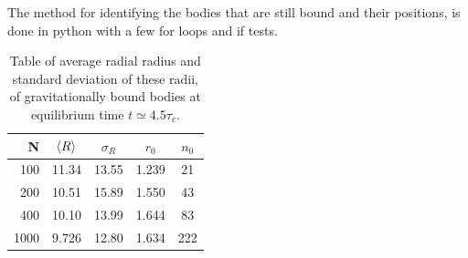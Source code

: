 \documentclass[11pt,a4paper,notitlepage,twocolumn]{article}
\begin{document}
The method for identifying the bodies that are still bound and their positions, is done in python with a few for loops and if tests.
\begin{table}
[H]\center
\begin{tabular}{|r|c|c|c|c|}\hline
	N & $\braket{R}$ & $\sigma_R$ & $r_0$ & $n_0$ \\ \hline
	100 & 11.34		& 13.55 & 1.239	& 21	\\ \hline
	200 & 10.51		& 15.89 & 1.550	& 43	\\ \hline
	400 & 10.10 	& 13.99 & 1.644	& 83	\\ \hline
	1000& 9.726		& 12.80	& 1.634	& 222	\\ \hline
\end{tabular}
\caption{Table of average radial radius and standard deviation of these radii, of gravitationally bound bodies at equilibrium time $t \simeq 4.5\tau_c$.}\label{tab:avgstd}
\end{table}
\end{document}
